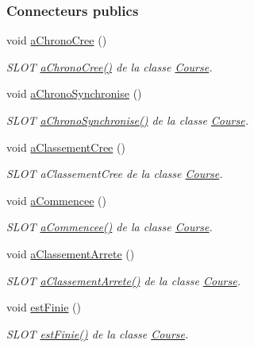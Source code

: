 \subsubsection*{Connecteurs publics}
\begin{DoxyCompactItemize}
\item 
void \hyperlink{class_course_ada484058a0180a31a98ee77c4fad93f8}{a\+Chrono\+Cree} ()
\begin{DoxyCompactList}\small\item\em S\+L\+OT \hyperlink{class_course_ada484058a0180a31a98ee77c4fad93f8}{a\+Chrono\+Cree()} de la classe \hyperlink{class_course}{Course}. \end{DoxyCompactList}\item 
void \hyperlink{class_course_a90c66d620f0726d92c40069f052e0cd0}{a\+Chrono\+Synchronise} ()
\begin{DoxyCompactList}\small\item\em S\+L\+OT \hyperlink{class_course_a90c66d620f0726d92c40069f052e0cd0}{a\+Chrono\+Synchronise()} de la classe \hyperlink{class_course}{Course}. \end{DoxyCompactList}\item 
void \hyperlink{class_course_a4a4f788b4ff5ca687c67f29753d26928}{a\+Classement\+Cree} ()
\begin{DoxyCompactList}\small\item\em S\+L\+OT a\+Classement\+Cree de la classe \hyperlink{class_course}{Course}. \end{DoxyCompactList}\item 
void \hyperlink{class_course_a8df970d7150703c3279903b09aa38855}{a\+Commencee} ()
\begin{DoxyCompactList}\small\item\em S\+L\+OT \hyperlink{class_course_a8df970d7150703c3279903b09aa38855}{a\+Commencee()} de la classe \hyperlink{class_course}{Course}. \end{DoxyCompactList}\item 
void \hyperlink{class_course_a43696137587262b721767f6113621772}{a\+Classement\+Arrete} ()
\begin{DoxyCompactList}\small\item\em S\+L\+OT \hyperlink{class_course_a43696137587262b721767f6113621772}{a\+Classement\+Arrete()} de la classe \hyperlink{class_course}{Course}. \end{DoxyCompactList}\item 
void \hyperlink{class_course_abbcfaecd40b5ec5e47419068423e767f}{est\+Finie} ()
\begin{DoxyCompactList}\small\item\em S\+L\+OT \hyperlink{class_course_abbcfaecd40b5ec5e47419068423e767f}{est\+Finie()} de la classe \hyperlink{class_course}{Course}. \end{DoxyCompactList}\item 

\end{DoxyCompactItemize}
